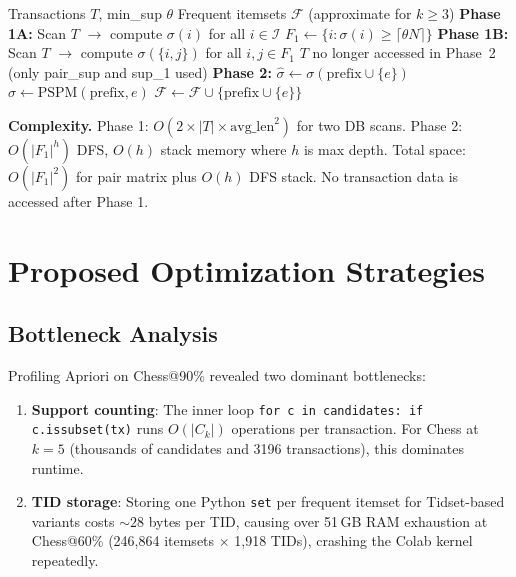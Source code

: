 \documentclass[conference]{IEEEtran}
\begin{document}
\begin{algorithm}[H]
\caption{ProbDF}
\begin{algorithmic}[1]
\Require Transactions $T$, min\_sup $\theta$
\Ensure Frequent itemsets $\mathcal{F}$ (approximate for $k \geq 3$)
\State \textbf{Phase 1A:} Scan $T$ $\to$ compute $\sigma(i)$ for all $i \in \mathcal{I}$
\State $F_1 \leftarrow \{i : \sigma(i) \geq \lceil\theta N\rceil\}$
\State \textbf{Phase 1B:} Scan $T$ $\to$ compute $\sigma(\{i,j\})$ for all $i,j \in F_1$
\State $T$ no longer accessed in Phase~2 (only pair\_sup and sup\_1 used)
\State \textbf{Phase 2:} 
      \State $\hat{\sigma} \leftarrow \sigma(\text{prefix} \cup \{e\})$ 
    \Else
      \State $\hat{\sigma} \leftarrow \text{PSPM}(\text{prefix}, e)$ 
    \EndIf
      \State $\mathcal{F} \leftarrow \mathcal{F} \cup \{\text{prefix} \cup \{e\}\}$
      \State {}
    \EndIf
  \EndFor
\EndProcedure
\end{algorithmic}
\end{algorithm}

\noindent\textbf{Complexity.}
Phase 1: $O(2 \times |T| \times \text{avg\_len}^2)$ for two DB scans.
Phase 2: $O(|F_1|^h)$ DFS, $O(h)$ stack memory where $h$ is max depth.
Total space: $O(|F_1|^2)$ for pair matrix plus $O(h)$ DFS stack.
No transaction data is accessed after Phase 1.

\section{Proposed Optimization Strategies}

\subsection{Bottleneck Analysis}

Profiling Apriori on Chess@90\% revealed two dominant bottlenecks:
\begin{enumerate}
  \item \textbf{Support counting}: The inner loop \texttt{for c in
    candidates: if c.issubset(tx)} runs $O(|C_k|)$ operations per
    transaction. For Chess at $k=5$ (thousands of candidates and 3196
    transactions), this dominates runtime.
  \item \textbf{TID storage}: Storing one Python \texttt{set} per
    frequent itemset for Tidset-based variants costs $\sim28$ bytes per
    TID, causing over 51\,GB RAM exhaustion at Chess@60\% (246,864 itemsets
    $\times$ 1,918 TIDs), crashing the Colab kernel repeatedly.
\end{enumerate}
\end{document}
